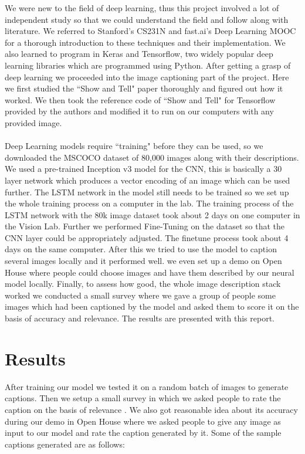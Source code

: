 \documentclass[11pt]{article}
\begin{document}
 We were new to the field of deep learning, thus this project involved a lot of independent study so that we could understand the field and follow along with literature. We referred to Stanford's CS231N \cite{cs231n} and fast.ai's Deep Learning MOOC\cite{fastai} for a thorough introduction to these techniques and their implementation. We also learned to program in Keras and Tensorflow, two widely popular deep learning libraries which are programmed using Python.  After getting a grasp of deep learning we proceeded into the image captioning part of the project. Here we first studied the ``Show and Tell" paper\cite{showandtell} thoroughly and figured out how it worked. We then took the reference code of ``Show and Tell" for Tensorflow provided by the authors and modified it to run on our computers with any provided image.\\\\Deep Learning models require ``training" before they can be used, so we downloaded the MSCOCO \cite{mscoco} dataset of 80,000 images along with their descriptions. We used a pre-trained Inception v3  model for the CNN, this is basically a 30 layer network which produces a vector encoding of an image which can be used further. The LSTM network in the model still needs to be trained so we set up the whole training process on a computer in the lab. The training process of the LSTM network with the 80k image dataset took about 2 days on one computer in the Vision Lab. Further we performed Fine-Tuning on the dataset so that the CNN layer could be appropriately adjusted. The finetune process took about 4 days on the same computer. After this we tried to use the model to caption several images locally and it performed well. we even set up a demo on Open House where people could choose images and have them described by our neural model locally. Finally, to assess how good, the whole image description stack worked we conducted a small survey where we gave a group of people some images which had been captioned by the model and asked them to score it on the basis of accuracy and relevance. The results are presented with this report.
\newpage
	\section{Results}
		After training our model we tested it on a random batch of images to generate captions. Then we setup a small survey in which we asked people to rate the caption on the basis of relevance . We also got reasonable idea about its accuracy during our demo in Open House where we asked people to give any image as input to our model and rate the caption generated by it. Some of the sample captions generated are as follows:
	
\end{document}
